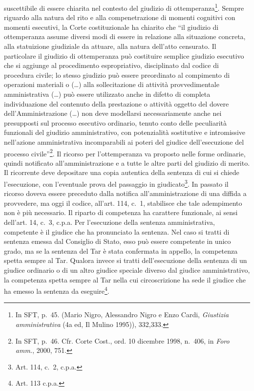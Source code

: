 \documentclass[12pt,it,a4paper,]{report}
\begin{document}
suscettibile di essere chiarita nel contesto del giudizio di
ottemperanza\footnote{In SFT, p.~45. (Mario Nigro, Alessandro Nigro e
  Enzo Cardi, \emph{Giustizia amministrativa} (4a ed, Il Mulino 1995)),
  332,333.}. Sempre riguardo alla natura del rito e alla compenetrazione
di momenti cognitivi con momenti esecutivi, la Corte costituzionale ha
chiarito che ``il giudizio di ottemperanza assume diversi modi di essere
in relazione alla situazione concreta, alla statuizione giudiziale da
attuare, alla natura dell'atto censurato. Il particolare il giudizio di
ottemperanza può costituire semplice giudizio esecutivo che si aggiunge
al procedimento espropriativo, disciplinato dal codice di procedura
civile; lo stesso giudizio può essere preordinato al compimento di
operazioni materiali o (\ldots) alla sollecitazione di attività
provvedimentale amministrativa (\ldots) può essere utilizzato anche in
difetto di completa individuazione del contenuto della prestazione o
attività oggetto del dovere dell'Amministrazione (\ldots) non deve
modellarsi necessariamente anche nei presupposti sul processo esecutivo
ordinario, tenuto conto delle peculiarità funzionali del giudizio
amministrativo, con potenzialità sostitutive e intromissive nell'azione
amministrativa incomparabili ai poteri del giudice dell'esecuzione del
processo civile''\footnote{In SFT, p.~46. Cfr. Corte Cost., ord. 10
  dicembre 1998, n.~406, in \emph{Foro amm.}, 2000, 751.}. Il ricorso
per l'ottemperanza va proposto nelle forme ordinarie, quindi notificato
all'amministrazione e a tutte le altre parti del giudizio di merito. Il
ricorrente deve depositare una copia autentica della sentenza di cui si
chiede l'esecuzione, con l'eventuale prova del passaggio in
giudicato\footnote{Art. 114, c.~2, c.p.a.}. In passato il ricorso doveva
essere preceduto dalla notifica all'amministrazione di una diffida a
provvedere, ma oggi il codice, all'art. 114, c.~1, stabilisce che tale
adempimento non è più necessario. Il riparto di competenza ha carattere
funzionale, ai sensi dell'art. 14, c.~3, c.p.a. Per l'esecuzione della
sentenza amministrativa, competente è il giudice che ha pronunciato la
sentenza. Nel caso si tratti di sentenza emessa dal Consiglio di Stato,
esso può essere competente in unico grado, ma se la sentenza del Tar è
stata confermata in appello, la competenza spetta sempre al Tar. Qualora
invece si tratti dell'esecuzione della sentenza di un giudice ordinario
o di un altro giudice speciale diverso dal giudice amministrativo, la
competenza spetta sempre al Tar nella cui circoscrizione ha sede il
giudice che ha emesso la sentenza da eseguire\footnote{Art. 113 c.p.a.}.
\end{document}

